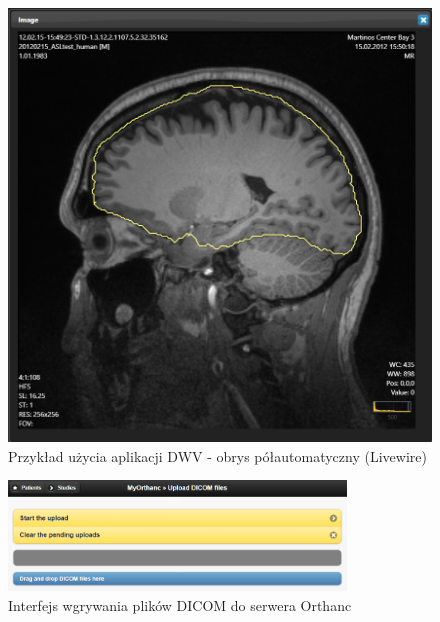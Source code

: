 \documentclass[a4paper,11pt,twoside,openright]{report}
\theoremstyle{definition}
\begin{document}
\begin{figure}[t]
	\includegraphics[width=1\textwidth]{DWV-interface}
	\caption{Przykład użycia aplikacji DWV - obrys półautomatyczny (Livewire)}
    	\label{fig:DWV-interface}
\end{figure}

\begin{figure}[b]
	\center
	\includegraphics[width=0.8\textwidth]{Orthanc-upload}
	\caption{Interfejs wgrywania plików DICOM do serwera Orthanc}
    	\label{fig:Orthanc-upload}
\end{figure}
\end{document}
